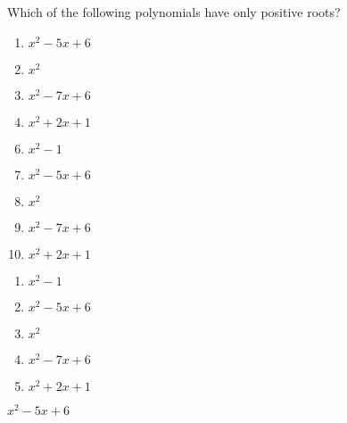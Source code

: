 

 Which of the following polynomials have only positive roots?


\ifsat
	\begin{enumerate}[label=\Alph*)]
		\item  $x^{2}-5x+6$ %
		\item  $x^{2}$
		\item  $x^2-7x+6$
		\item  $x^2+2x+1$
	\end{enumerate}
\else
\fi

\ifacteven
	\begin{enumerate}[label=\textbf{\Alph*.},itemsep=\fill,align=left]
		\setcounter{enumii}{5}
		\item  $x^{2}-1$
		\item  $x^{2}-5x+6$ %
		\item  $x^{2}$
		\addtocounter{enumii}{1}
		\item  $x^2-7x+6$
		\item  $x^2+2x+1$
	\end{enumerate}
\else
\fi

\ifactodd
	\begin{enumerate}[label=\textbf{\Alph*.},itemsep=\fill,align=left]
		\item  $x^{2}-1$
		\item  $x^{2}-5x+6$ %
		\item  $x^{2}$
		\item  $x^2-7x+6$
		\item  $x^2+2x+1$
	\end{enumerate}
\else
\fi

\ifgridin
  $x^{2}-5x+6$ %
		
\else
\fi

